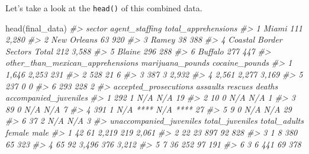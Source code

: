 \documentclass[
  12pt,
]{book}
\newenvironment{Shaded}{\begin{snugshade}}{\end{snugshade}}
\newcommand{\CommentTok}[1]{\textcolor[rgb]{0.37,0.37,0.37}{\textit{#1}}}
\newcommand{\FunctionTok}[1]{\textcolor[rgb]{0,0,0}{#1}}
\newcommand{\NormalTok}[1]{#1}
\begin{document}
Let's take a look at the \texttt{head()} of this combined data.

\begin{Shaded}
\begin{Highlighting}[]
\FunctionTok{head}\NormalTok{(final\_data)}
\CommentTok{\#\textgreater{}                         sector agent\_staffing total\_apprehensions}
\CommentTok{\#\textgreater{} 1                        Miami            111               2,280}
\CommentTok{\#\textgreater{} 2                  New Orleans             63                 920}
\CommentTok{\#\textgreater{} 3                        Ramey             38                 388}
\CommentTok{\#\textgreater{} 4 Coastal Border Sectors Total            212               3,588}
\CommentTok{\#\textgreater{} 5                       Blaine            296                 288}
\CommentTok{\#\textgreater{} 6                      Buffalo            277                 447}
\CommentTok{\#\textgreater{}   other\_than\_mexican\_apprehensions marijuana\_pounds cocaine\_pounds}
\CommentTok{\#\textgreater{} 1                            1,646            2,253            231}
\CommentTok{\#\textgreater{} 2                              528               21              6}
\CommentTok{\#\textgreater{} 3                              387                3          2,932}
\CommentTok{\#\textgreater{} 4                            2,561            2,277          3,169}
\CommentTok{\#\textgreater{} 5                              237                0              0}
\CommentTok{\#\textgreater{} 6                              293              228              2}
\CommentTok{\#\textgreater{}   accepted\_prosecutions assaults           rescues deaths accompanied\_juveniles}
\CommentTok{\#\textgreater{} 1                   292        1               N/A    N/A                    19}
\CommentTok{\#\textgreater{} 2                    10        0               N/A    N/A                     1}
\CommentTok{\#\textgreater{} 3                    89        0               N/A    N/A                     7}
\CommentTok{\#\textgreater{} 4                   391        1 N/A **** N/A ****                           27}
\CommentTok{\#\textgreater{} 5                     9        0               N/A    N/A                    29}
\CommentTok{\#\textgreater{} 6                    37        2               N/A    N/A                     3}
\CommentTok{\#\textgreater{}   unaccompanied\_juveniles total\_juveniles total\_adults female  male}
\CommentTok{\#\textgreater{} 1                      42              61        2,219    219 2,061}
\CommentTok{\#\textgreater{} 2                      22              23          897     92   828}
\CommentTok{\#\textgreater{} 3                       1               8          380     65   323}
\CommentTok{\#\textgreater{} 4                      65              92        3,496    376 3,212}
\CommentTok{\#\textgreater{} 5                       7              36          252     97   191}
\CommentTok{\#\textgreater{} 6                       3               6          441     69   378}
\end{Highlighting}
\end{Shaded}
\end{document}
